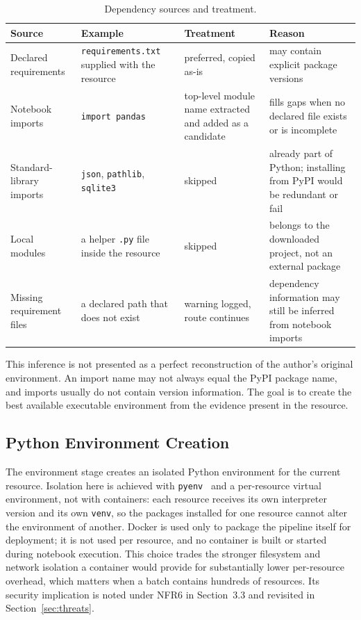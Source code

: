 \begin{table}[ht]
\centering
\caption{Dependency sources and treatment.}
\label{tab:dependency-sources}
\small
\begin{tabularx}{\textwidth}{@{}p{2.8cm}p{3.0cm}p{3.0cm}X@{}}
\toprule
Source & Example & Treatment & Reason\tabularnewline
\midrule
Declared requirements & \texttt{requirements.txt} supplied with the resource & preferred, copied as-is & may contain explicit package versions\tabularnewline
Notebook imports & \texttt{import pandas} & top-level module name extracted and added as a candidate & fills gaps when no declared file exists or is incomplete\tabularnewline
Standard-library imports & \texttt{json}, \texttt{pathlib}, \texttt{sqlite3} & skipped & already part of Python; installing from PyPI would be redundant or fail\tabularnewline
Local modules & a helper \texttt{.py} file inside the resource & skipped & belongs to the downloaded project, not an external package\tabularnewline
Missing requirement files & a declared path that does not exist & warning logged, route continues & dependency information may still be inferred from notebook imports\tabularnewline
\bottomrule
\end{tabularx}
\end{table}

This inference is not presented as a perfect reconstruction of the author's original environment. An import name may not always equal the PyPI package name, and imports usually do not contain version information. The goal is to create the best available executable environment from the evidence present in the resource.

\subsection{Python Environment Creation}

The environment stage creates an isolated Python environment for the current resource. Isolation here is achieved with \texttt{pyenv}~\cite{pyenv} and a per-resource virtual environment, not with containers: each resource receives its own interpreter version and its own \texttt{venv}, so the packages installed for one resource cannot alter the environment of another. Docker is used only to package the pipeline itself for deployment; it is not used per resource, and no container is built or started during notebook execution. This choice trades the stronger filesystem and network isolation a container would provide for substantially lower per-resource overhead, which matters when a batch contains hundreds of resources. Its security implication is noted under NFR6 in Section~3.3 and revisited in Section~\ref{sec:threats}.

